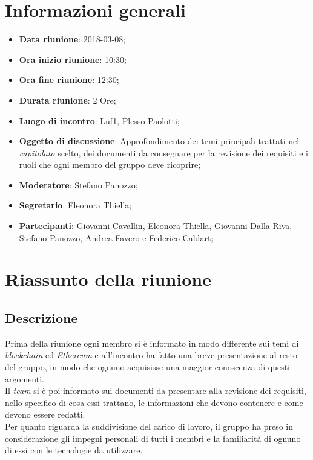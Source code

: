 \section{Informazioni generali}
	\begin{itemize}
		\item \textbf{Data riunione}: 2018-03-08;
		\item \textbf{Ora inizio riunione}: 10:30;
		\item \textbf{Ora fine riunione}: 12:30;
		\item \textbf{Durata riunione}: 2 Ore;
		\item \textbf{Luogo di incontro}: Luf1, Plesso Paolotti;
		\item \textbf{Oggetto di discussione}: Approfondimento dei temi principali trattati nel \emph{capitolato} scelto, dei documenti da consegnare per la revisione dei requisiti e i ruoli che ogni membro del gruppo deve ricoprire;
		\item \textbf{Moderatore}: Stefano Panozzo;
		\item \textbf{Segretario}: Eleonora Thiella;
		\item \textbf{Partecipanti}: Giovanni Cavallin, Eleonora Thiella, Giovanni Dalla Riva, Stefano Panozzo, Andrea Favero e Federico Caldart;
	\end{itemize}

\section{Riassunto della riunione}
	\subsection{Descrizione}
	Prima della riunione ogni membro si è informato in modo differente sui temi di \emph{blockchain} ed \emph{Ethereum} e all'incontro ha fatto una breve presentazione al resto del gruppo, in modo che ognuno acquisisse una maggior conoscenza di questi argomenti.
	\\Il \emph{team} si è poi informato sui documenti da presentare alla revisione dei requisiti, nello specifico di cosa essi trattano, le informazioni che devono contenere e come devono essere redatti.
	\\Per quanto riguarda la suddivisione del carico di lavoro, il gruppo ha preso in considerazione gli impegni personali di tutti i membri e la familiarità di ognuno di essi con le tecnologie da utilizzare.
